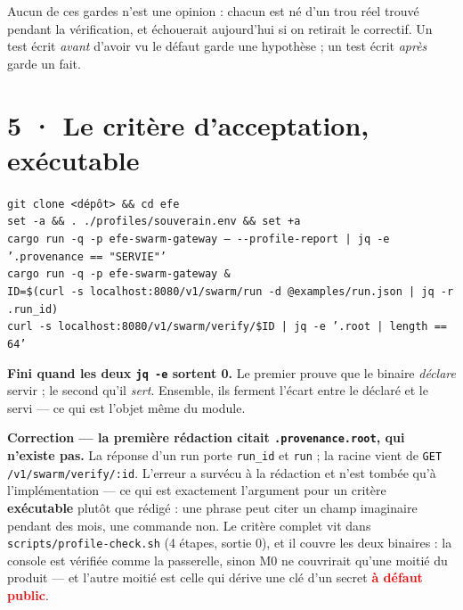 \documentclass[10pt]{article}
\newcommand{\pire}[1]{\textcolor{red}{\textbf{#1}}}
\newcommand{\code}[1]{\texttt{\small #1}}
\begin{document}
\begin{these}
Aucun de ces gardes n'est une opinion : chacun est né d'un trou réel trouvé pendant la vérification,
et échouerait aujourd'hui si on retirait le correctif. Un test écrit \emph{avant} d'avoir vu le
défaut garde une hypothèse ; un test écrit \emph{après} garde un fait.
\end{these}

\section{5 · Le critère d'acceptation, exécutable}

\begin{extrait}
\code{git clone <dépôt> \&\& cd efe} \\
\code{set -a \&\& . ./profiles/souverain.env \&\& set +a} \\[3pt]
\code{cargo run -q -p efe-swarm-gateway -- -{}-profile-report | jq -e '.provenance == "SERVIE"'} \\
\code{cargo run -q -p efe-swarm-gateway \&} \\
\code{ID=\$(curl -s localhost:8080/v1/swarm/run -d @examples/run.json | jq -r .run\_id)} \\
\code{curl -s localhost:8080/v1/swarm/verify/\$ID | jq -e '.root | length == 64'}
\end{extrait}

\textbf{Fini quand les deux \code{jq -e} sortent 0.} Le premier prouve que le binaire \emph{déclare}
servir ; le second qu'il \emph{sert}. Ensemble, ils ferment l'écart entre le déclaré et le servi ---
ce qui est l'objet même du module.

\begin{alerte}
\textbf{Correction --- la première rédaction citait \code{.provenance.root}, qui n'existe pas.} La
réponse d'un run porte \code{run\_id} et \code{run} ; la racine vient de
\code{GET /v1/swarm/verify/:id}. L'erreur a survécu à la rédaction et n'est tombée qu'à
l'implémentation --- ce qui est exactement l'argument pour un critère \textbf{exécutable} plutôt que
rédigé : une phrase peut citer un champ imaginaire pendant des mois, une commande non. Le critère
complet vit dans \code{scripts/profile-check.sh} (4 étapes, sortie 0), et il couvre les deux
binaires : la console est vérifiée comme la passerelle, sinon M0 ne couvrirait qu'une moitié du
produit --- et l'autre moitié est celle qui dérive une clé d'un secret \pire{à défaut public}.
\end{alerte}
\end{document}

